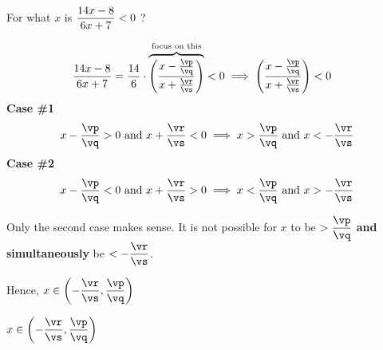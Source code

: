 

\FRACTIONSIMPLIFY\vb\va\vp\vq
\FRACTIONSIMPLIFY\vd\vc\vr\vs

\question[3] For what $x$ is $\dfrac{14 x-8}{6 x+7} < 0$ ?

\watchout

\begin{solution}[\mcq]
  \begin{align}
    \dfrac{\va x - \vb}{\vc  x + \vd } &= 
    \dfrac\va\vc\cdot\overbrace{\left(\dfrac{x-\frac\vp\vq}{x+\frac\vr\vs}\right)}^{\text{focus on this}} < 0
    \implies\left(\dfrac{x-\frac\vp\vq}{x+\frac\vr\vs}\right) < 0
  \end{align}
  \textbf{Case \#1}
  \[ x-\dfrac\vp\vq > 0 \text{ and } x+\dfrac\vr\vs < 0\implies x>\dfrac\vp\vq\text{ and }x<-\dfrac\vr\vs \]
  \textbf{Case \#2}
  \[ x-\dfrac\vp\vq < 0 \text{ and } x+\dfrac\vr\vs > 0\implies x<\dfrac\vp\vq\text{ and }x>-\dfrac\vr\vs \]

  Only the second case makes sense. It is not possible for $x$ to be $>\dfrac\vp\vq$\textbf{ and simultaneously } be $<-\dfrac\vr\vs$.

  Hence, 
  $x\in\left( -\dfrac\vr\vs, \dfrac\vp\vq \right)$
\end{solution}

\ifprintanswers
  \begin{codex}
    $x\in\left( -\dfrac\vr\vs, \dfrac\vp\vq \right)$
  \end{codex}
\fi
